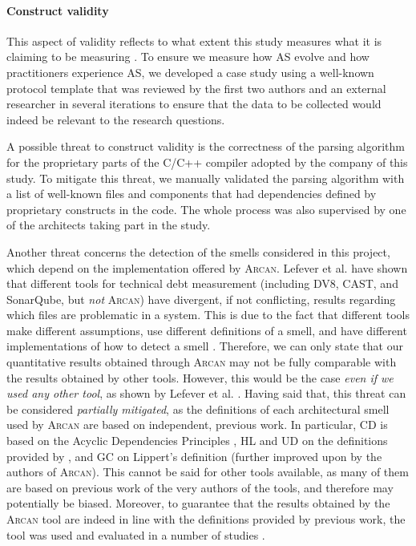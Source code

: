 \paragraph{Construct validity}
This aspect of validity reflects to what extent this study measures what it is claiming to be measuring \cite{Runeson2012}.
To ensure we measure how AS evolve and how practitioners experience AS, we developed a case study using a well-known protocol template \cite{Brereton2008} that was reviewed by the first two authors and an external researcher in several iterations to ensure that the data to be collected would indeed be relevant to the research questions.

A possible threat to construct validity is the correctness of the parsing algorithm for the proprietary parts of the C/C++ compiler adopted by the company of this study. 
To mitigate this threat, we manually validated the parsing algorithm with a list of well-known files and components that had dependencies defined by proprietary constructs in the code.
The whole process was also supervised by one of the architects taking part in the study.

Another threat concerns the detection of the smells considered in this project, which depend on the implementation offered by \textsc{Arcan}.
Lefever et al. \cite{Lefever2021} have shown that different tools for technical debt measurement (including DV8, CAST, and SonarQube, but \emph{not} \textsc{Arcan}) have divergent, if not conflicting, results regarding which files are problematic in a system.
This is due to the fact that different tools make different assumptions, use different definitions of a smell, and have different implementations of how to detect a smell \cite{Lefever2021}.
Therefore, we can only state that our quantitative results obtained through \textsc{Arcan} may not be fully comparable with the results obtained by other tools.
However, this would be the case \emph{even if we used any other tool}, as shown by Lefever et al. \cite{Lefever2021}. 
Having said that, this threat can be considered \emph{partially mitigated}, as the definitions of each architectural smell used by \textsc{Arcan} are based on independent, previous work.
In particular, CD is based on the Acyclic Dependencies Principles \cite{Martin2018,Lippert2006}, HL and UD on the definitions provided by \cite{Samarthyam2016,Martin2018}, and GC on Lippert's definition \cite{Lippert2006} (further improved upon by the authors of \textsc{Arcan}).
This cannot be said for other tools available, as many of them are based on previous work of the very authors of the tools, and therefore may potentially be biased.
Moreover, to guarantee that the results obtained by the \textsc{Arcan} tool are indeed in line with the definitions provided by previous work, the tool was used and evaluated in a number of studies \cite{Arcelli2016,Biaggi2018,Sas2019}.

